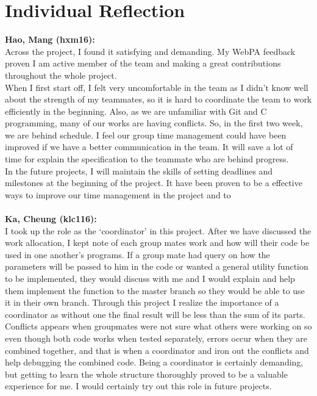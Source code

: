 \documentclass[11pt]{article}
\begin{document}
\section{Individual Reflection}
\textbf{Hao, Mang (hxm16):}
\\ Across the project, I found it satisfying and demanding. My WebPA feedback proven I am active member of the team and making a great contributions throughout the whole project.
\\When I first start off, I felt very uncomfortable in the team  as I didn’t know well about the strength of my teammates, so it is hard to coordinate the team to work efficiently in the beginning. Also, as we are unfamiliar with Git and C programming, many of our works are having conflicts. So, in the first two week, we are behind schedule. I feel our group time management could have been improved if we have a better communication in the team. It will save a lot of time for explain the specification to the teammate who are behind progress.
\\In the future projects, I will maintain the skills of setting deadlines and milestones at the beginning of the project. It have been proven to be a effective ways to improve our time management in the project and to 
\\
\\
\textbf{Ka, Cheung (klc116):}
\\I took up the role as the ‘coordinator’ in this project. After we have discussed the work allocation, I kept note of each group mates work and how will their code be used in one another’s programs. If a group mate had query on how the parameters will be passed to him in the code or wanted a general utility function to be implemented, they would discuss with me and I would explain and help them implement the function to the master branch so they would be able to use it in their own branch. Through this project I realize the importance of a coordinator as without one the final result will be less than the sum of its parts. Conflicts appears when groupmates were not sure what others were working on so even though both code works when tested separately, errors occur when they are combined together, and that is when a coordinator and iron out the conflicts and help debugging the combined code. Being a coordinator is certainly demanding, but getting to learn the whole structure thoroughly proved to be a valuable experience for me. I would certainly try out this role in future projects.  
\\
\\
\end{document}
